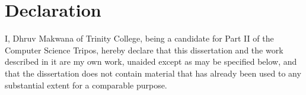 \newpage
\section*{Declaration}

I, Dhruv Makwana of Trinity College, being a candidate for Part II of the
Computer Science Tripos, hereby declare that this dissertation and the work
described in it are my own work, unaided except as may be specified below, and
that the dissertation does not contain material that has already been used to
any substantial extent for a comparable purpose.

\bigskip
{}

\bigskip
{}
